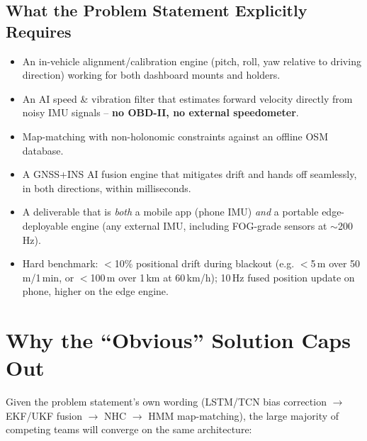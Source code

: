 \documentclass[10.5pt]{article}
\begin{document}
\subsection{What the Problem Statement Explicitly Requires}
\begin{itemize}
\item An in-vehicle alignment/calibration engine (pitch, roll, yaw relative to driving direction) working for both dashboard mounts and holders.
\item An AI speed \& vibration filter that estimates forward velocity directly from noisy IMU signals -- \textbf{no OBD-II, no external speedometer}.
\item Map-matching with non-holonomic constraints against an offline OSM database.
\item A GNSS+INS AI fusion engine that mitigates drift and hands off seamlessly, in both directions, within milliseconds.
\item A deliverable that is \emph{both} a mobile app (phone IMU) \emph{and} a portable edge-deployable engine (any external IMU, including FOG-grade sensors at $\sim$200\,Hz).
\item Hard benchmark: $<$10\% positional drift during blackout (e.g. $<$5\,m over 50\,m/1\,min, or $<$100\,m over 1\,km at 60\,km/h); 10\,Hz fused position update on phone, higher on the edge engine.
\end{itemize}

\section{Why the ``Obvious'' Solution Caps Out}

Given the problem statement's own wording (LSTM/TCN bias correction $\rightarrow$ EKF/UKF fusion $\rightarrow$ NHC $\rightarrow$ HMM map-matching), the large majority of competing teams will converge on the same architecture:

\begin{center}
\end{center}
\end{document}
